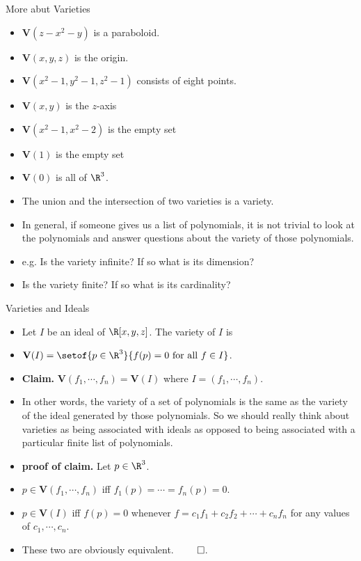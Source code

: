 \documentclass{beamer}
\begin{document}

\begin{frame}{More abut Varieties}

\begin{itemize}
  \item $\mathbf{V}(z-x^2-y)$ is a paraboloid.
  \item $\mathbf{V}(x,y,z)$ is the origin.
  \item $\mathbf{V}(x^2-1,y^2-1,z^2-1)$ consists of eight points.
  \item $\mathbf{V}(x,y)$ is the $z$-axis
  \item $\mathbf{V}(x^2 - 1,x^2 - 2)$ is the empty set
  \item $\mathbf{V}(1)$ is the empty set
  \item $\mathbf{V}(0)$ is all of $\R^3$.
  \item The union and the intersection of two varieties is a variety.
  \item In general, if someone gives us a list of polynomials, it is not trivial to look at the polynomials and
  answer questions about the variety of those polynomials.
  \item e.g. Is the variety infinite? If so what is its dimension?
  \item Is the variety finite? If so what is its cardinality?

\end{itemize}
\end{frame}


\begin{frame}{Varieties and Ideals}

\begin{itemize}
  \item Let $I$ be an ideal of $\R[x,y,z]$. The variety of $I$ is
  \item $\mathbf{V}(I) = \setof{p\in\R^3}{f(p)=0\text{ for all } f\in I}$.
  \item \textbf{Claim.} $\mathbf{V}(f_1,\cdots,f_n) = \mathbf{V}(I)$ where $I = (f_1,\cdots,f_n)$.
  \item In other words, the variety of a set of polynomials is the same as the variety of the ideal generated by those polynomials.
  So we should really think about varieties as being associated with ideals as opposed to being associated with a particular finite list of polynomials.
  \item \textbf{proof of claim.} Let $p\in\R^3$.
  \item $p\in \textbf{V}(f_1,\cdots,f_n)$ iff $f_1(p) = \cdots = f_n(p) = 0$.
  \item $p\in \textbf{V}(I)$ iff $f(p)=0$ whenever $f=c_1f_1 + c_2f_2 + \cdots + c_nf_n$ for any values of $c_1,\cdots,c_n$.
  \item These two are obviously equivalent. $\qed$.
\end{itemize}
\end{frame}
\end{document}
